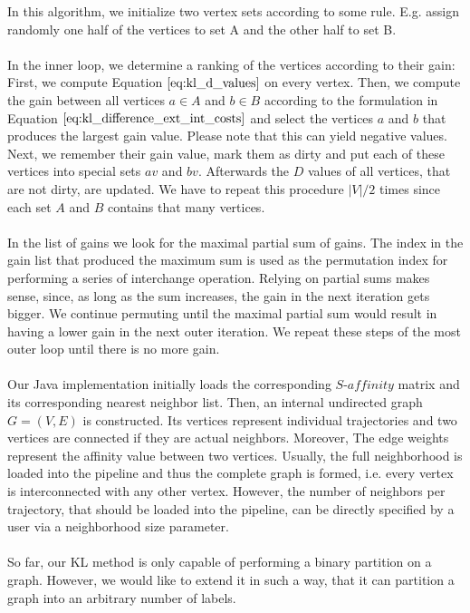 In this algorithm, we initialize two vertex sets according to some rule. E.g. assign randomly one half of the vertices to set A and the other half to set B. \\ \\
In the inner loop, we determine a ranking of the vertices according to their gain: First, we compute Equation $\ref{eq:kl_d_values}$ on every vertex. Then, we compute the gain between all vertices $a \in A$ and $b \in B$ according to the formulation in Equation $\ref{eq:kl_difference_ext_int_costs}$ and select the vertices $a$ and $b$ that produces the largest gain value. Please note that this can yield negative values. Next, we remember their gain value, mark them as dirty and put each of these vertices into special sets $av$ and $bv$. Afterwards the $D$ values of all vertices, that are not dirty, are updated. We have to repeat this procedure $|V|/2$ times since each set $A$ and $B$ contains that many vertices. \\ \\
In the list of gains we look for the maximal partial sum of gains. The index in the gain list that produced the maximum sum is used as the permutation index for performing a series of interchange operation. Relying on partial sums makes sense, since, as long as the sum increases, the gain in the next iteration gets bigger. We continue permuting until the maximal partial sum would result in having a lower gain in the next outer iteration. We repeat these steps of the most outer loop until there is no more gain. \\ \\
Our Java implementation initially loads the corresponding $\textit{S-affinity}$ matrix and its corresponding nearest neighbor list. Then, an internal undirected graph $G = \left( V, E \right)$ is constructed. Its vertices represent individual trajectories and two vertices are connected if they are actual neighbors. Moreover, The edge weights represent the affinity value between two vertices. Usually, the full neighborhood is loaded into the pipeline and thus the complete graph is formed, i.e. every vertex is interconnected with any other vertex. However, the number of neighbors per trajectory, that should be loaded into the pipeline, can be directly specified by a user via a neighborhood size parameter. \\ \\ 
So far, our KL method is only capable of performing a binary partition on a graph. However, we would like to extend it in such a way, that it can partition a graph into an arbitrary number of labels. \\ \\
